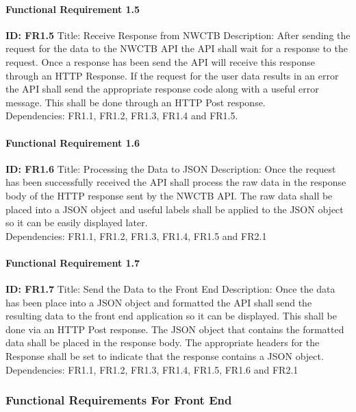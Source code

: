 \documentclass[onecolumn, draftclsnofoot,10pt, compsoc]{article}
\begin{document}
					\paragraph{Functional Requirement 1.5}
						\textbf{ID: FR1.5}\hfill \break
						Title: Receive Response from NWCTB\hfill \break
						Description: After sending the request for the data to the NWCTB API the API shall wait for a response to the request. Once a response has been send the API will receive this response through an HTTP Response. If the request for the user data results in an error the API shall send the appropriate response code along with a useful error message. This shall be done through an HTTP Post response.\\
						Dependencies: FR1.1, FR1.2, FR1.3, FR1.4 and FR1.5.\hfill \break

					\paragraph{Functional Requirement 1.6}
							\textbf{ID: FR1.6}\hfill \break
							Title: Processing the Data to JSON\hfill \break
							Description: Once the request has been successfully received the API shall process the raw data in the response body of the HTTP response sent by the NWCTB API. The raw data shall be placed into a JSON object and useful labels shall be applied to the JSON object so it can be easily displayed later.\\
							Dependencies: FR1.1, FR1.2, FR1.3, FR1.4, FR1.5 and FR2.1\hfill \break

					\paragraph{Functional Requirement 1.7}
						\textbf{ID: FR1.7}\hfill \break
						Title: Send the Data to the Front End\hfill \break
						Description: Once the data has been place into a JSON object and formatted the API shall send the resulting data to the front end application so it can be displayed. This shall be done via an HTTP Post response. The JSON object that contains the formatted data shall be placed in the response body. The appropriate headers for the Response shall be set to indicate that the response contains a JSON object.\\
						Dependencies: FR1.1, FR1.2, FR1.3, FR1.4, FR1.5, FR1.6 and FR2.1\hfill \break

			\subsubsection{Functional Requirements For Front End}
\end{document}
